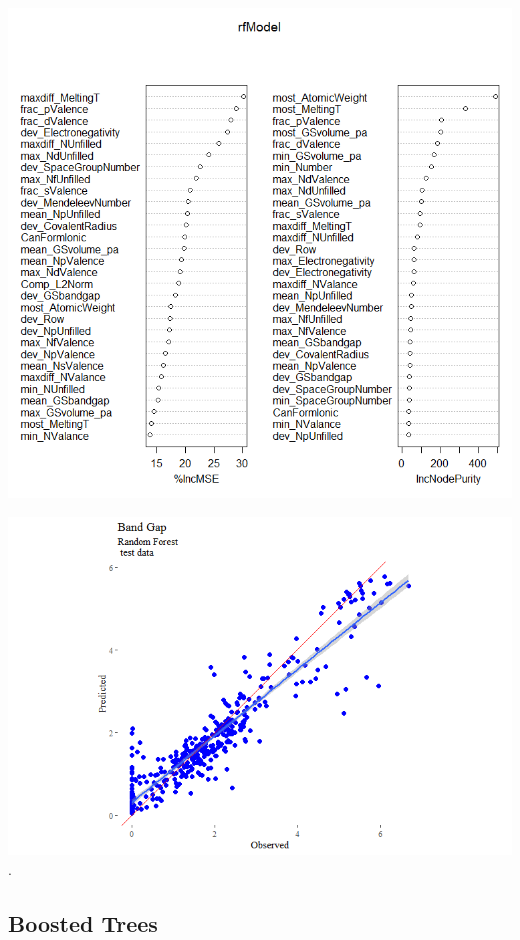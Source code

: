 \documentclass[10pt, letter]{report}
\renewcommand{\=}{\, =\, }
\newcommand{\+}{\, +\, }
\renewcommand{\-}{\, -\, }
\begin{document}
\begin{center}
\includegraphics[scale = 0.8]{RandomForestVariableImportance.png}
\end{center}

\begin{center}
\includegraphics[scale = 0.8]{RandomForestTestDataFit.png}
.
\end{center}

\subsection{Boosted Trees}
\end{document}
